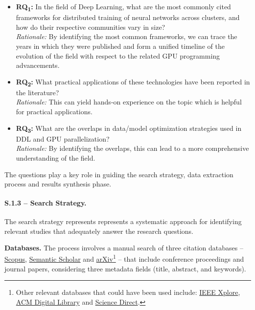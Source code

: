 \label{sec:research_questions_refined}
\begin{itemize}
	\item \textbf{RQ\textsubscript{1}:} In the field of Deep Learning, what are the most commonly cited
	      frameworks for distributed training of neural networks across clusters, and how do their respective communities vary in size? \\
	      \textit{Rationale:} By identifying the most common frameworks, we can trace the years in which they were published
	      and form a unified timeline of the evolution of the field with respect to the related GPU programming advancements.

	\item \textbf{RQ\textsubscript{2}:} What practical applications of these technologies have been reported in the literature? \\
	      \textit{Rationale:} This can yield hands-on experience on the topic which is helpful for practical applications.

	\item \textbf{RQ\textsubscript{3}:} What are the overlaps in data/model optimization strategies used in DDL and GPU parallelization? \\
	      \textit{Rationale:} By identifying the overlaps, this can lead to a more comprehensive understanding of the field.
\end{itemize}

The questions play a key role in guiding the search strategy, data extraction process and results
synthesis phase.

\paragraph{S.1.3 -- Search Strategy.}
The search strategy represents represents a systematic approach for identifying relevant studies
that adequately answer the research questions.

\textbf{Databases.}
The process involves a manual search of three citation databases --
\href{https://www.scopus.com/}{Scopus}, \href{https://www.semanticscholar.org/}{Semantic Scholar}
and \href{https://arxiv.org/}{arXiv}\footnote{Other relevant databases that could have been used
	include: \href{https://ieeexplore.ieee.org/}{IEEE Xplore}, \href{https://dl.acm.org/}{ACM Digital
		Library} and \href{https://www.sciencedirect.com/}{Science Direct}.} -- that include conference
proceedings and journal papers, considering three metadata fields (title, abstract, and keywords).

